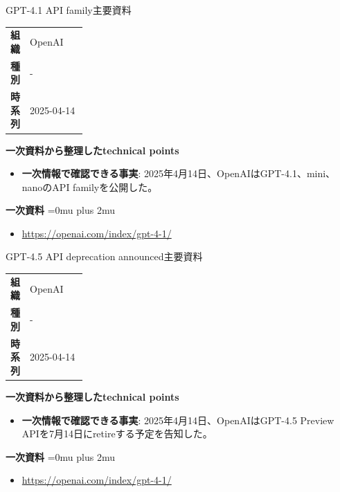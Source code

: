 \begin{technicalnote}{GPT-4.1 API family}{主要資料}
\begingroup
\begin{tabularx}{\linewidth}{@{}>{\bfseries}p{0.22\linewidth}X@{}}
組織 & OpenAI \\
種別 & - \\
時系列 & 2025-04-14 \\
\end{tabularx}
\smallskip
{\bfseries 一次資料から整理したtechnical points}
\begin{itemize}[leftmargin=1.5em,itemsep=0.35em]
\item \textbf{一次情報で確認できる事実}: 2025年4月14日、OpenAIはGPT-4.1、mini、nanoのAPI familyを公開した。
\end{itemize}
\begin{samepage}
{\bfseries 一次資料}
\begingroup\sloppy
\Urlmuskip=0mu plus 2mu\relax
\begin{itemize}[leftmargin=1.5em,itemsep=0.25em]
\item {\scriptsize\url{https://openai.com/index/gpt-4-1/}}
\end{itemize}
\endgroup
\end{samepage}
\endgroup
\end{technicalnote}
\medskip

\begin{technicalnote}{GPT-4.5 API deprecation announced}{主要資料}
\begingroup
\begin{tabularx}{\linewidth}{@{}>{\bfseries}p{0.22\linewidth}X@{}}
組織 & OpenAI \\
種別 & - \\
時系列 & 2025-04-14 \\
\end{tabularx}
\smallskip
{\bfseries 一次資料から整理したtechnical points}
\begin{itemize}[leftmargin=1.5em,itemsep=0.35em]
\item \textbf{一次情報で確認できる事実}: 2025年4月14日、OpenAIはGPT-4.5 Preview APIを7月14日にretireする予定を告知した。
\end{itemize}
\begin{samepage}
{\bfseries 一次資料}
\begingroup\sloppy
\Urlmuskip=0mu plus 2mu\relax
\begin{itemize}[leftmargin=1.5em,itemsep=0.25em]
\item {\scriptsize\url{https://openai.com/index/gpt-4-1/}}
\end{itemize}
\endgroup
\end{samepage}
\endgroup
\end{technicalnote}
\medskip

